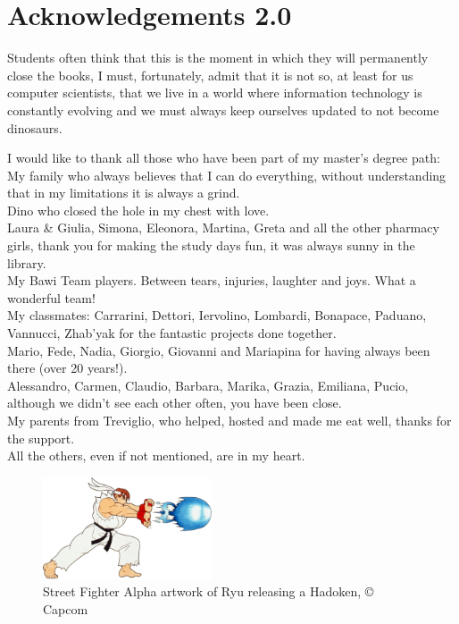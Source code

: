 \chapter*{Acknowledgements 2.0}

Students often think that this is the moment in which they will permanently close the books, I must, fortunately, admit that it is not so, at least for us computer scientists, that we live in a world where information technology is constantly evolving and we must always keep ourselves updated to not become dinosaurs.

I would like to thank all those who have been part of my master's degree path:\\
My family who always believes that I can do everything, without understanding that in my limitations it is always a grind.\\
Dino who closed the hole in my chest with love.\\
Laura \& Giulia, Simona, Eleonora, Martina, Greta and all the other pharmacy girls, thank you for making the study days fun, it was always sunny in the library.\\
My Bawi Team players. Between tears, injuries, laughter and joys. What a wonderful team!\\
My classmates: Carrarini, Dettori, Iervolino, Lombardi, Bonapace, Paduano, Vannucci, Zhab'yak for the fantastic projects done together.\\
Mario, Fede, Nadia, Giorgio, Giovanni and Mariapina for having always been there (over 20 years!).\\
Alessandro, Carmen, Claudio, Barbara, Marika, Grazia, Emiliana, Pucio, although we didn't see each other often, you have been close.\\
My parents from Treviglio, who helped, hosted and made me eat well, thanks for the support.\\
All the others, even if not mentioned, are in my heart.

\vspace*{\fill}

\begin{figure}[H]
	\centering
	\includegraphics[width=5cm]{immagini/hadoken}
	\caption{Street Fighter Alpha artwork of Ryu releasing a Hadoken, © Capcom}
	\label{fig:hadoken}
\end{figure}